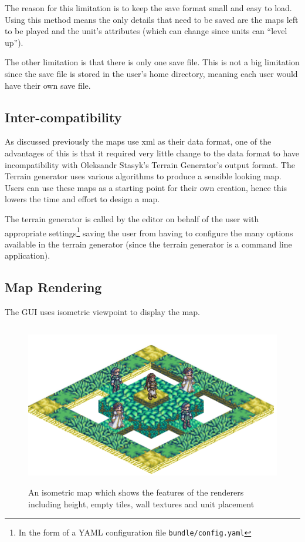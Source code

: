 The reason for this limitation is to keep the save format small and easy to load. Using this method means the only details that need to be saved are the maps left to be played and the unit's attributes (which can change since units can ``level up''). 

The other limitation is that there is only one save file. This is not a big limitation since the  save file is stored in the user's home directory, meaning each user would have their own save file.

\subsection{Inter-compatibility}
\label{ssub:intercompatibility}
As discussed previously the maps use xml as their data format, one of the advantages of this is that it required very little change to the data format to have incompatibility with Oleksandr Stasyk's  Terrain Generator's output format.  The Terrain generator uses various algorithms to produce a sensible looking map. Users can use these maps as a starting point for their own creation, hence this lowers the time and effort to design a map.

The terrain generator is called by the editor on behalf of the user with appropriate settings\footnote{In the form of a YAML configuration file \texttt{bundle/config.yaml}} saving the user from having to configure the many options available in the terrain generator (since the terrain generator is a command line application).

\subsection{Map Rendering}
\label{ssub:map_rendering}

The GUI uses isometric viewpoint to display the map. 
\begin{figure}[htbp]
	\centering
		\includegraphics[height=2.8in]{figures/imp-map.png}
	\caption{An isometric map which shows the features of the renderers including height, empty tiles, wall textures and unit placement}
	\label{fig:figures_imp-map}
\end{figure}

